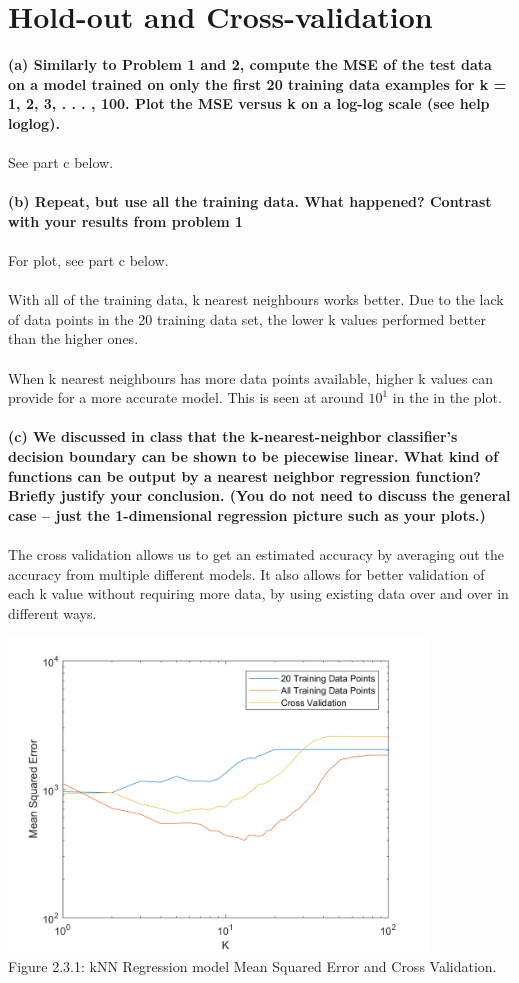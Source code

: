 \documentclass[]{report}   %
\begin{document}
\section{Hold-out and Cross-validation}
{\bf (a) Similarly to Problem 1 and 2, compute the MSE of the test data on a model trained on only the first 20 training data examples for k = 1, 2, 3, . . . , 100. Plot the MSE versus k on a log-log scale (see help loglog).}
\\~\\
See part c below.
\\~\\
{\bf (b) Repeat, but use all the training data. What happened? Contrast with your results from problem 1}
\\~\\
For plot, see part c below.
\\~\\
With all of the training data, k nearest neighbours works better. Due to the lack of data points in the 20 training data set, the lower k values performed better than the higher ones. 
\\~\\
When k nearest neighbours has more data points available, higher k values can provide for a more accurate model. This is seen at around $10^1$ in the in the plot.
\\~\\
{\bf (c) We discussed in class that the k-nearest-neighbor classifier’s decision boundary can be shown to be piecewise linear. What kind of functions can be output by a nearest neighbor regression function? Briefly justify your conclusion. (You do not need to discuss the general case – just the 1-dimensional regression picture such as your plots.)}
\\~\\
The cross validation allows us to get an estimated accuracy by averaging out the accuracy from multiple different models. It also allows for better validation of each k value without requiring more data, by using existing data over and over in different ways.
\begin{center}
	\includegraphics[width=30em,keepaspectratio]{2_3_Figure_1.png}\\
	{Figure 2.3.1: kNN Regression model Mean Squared Error and Cross Validation.}
\end{center} 
\end{document}
